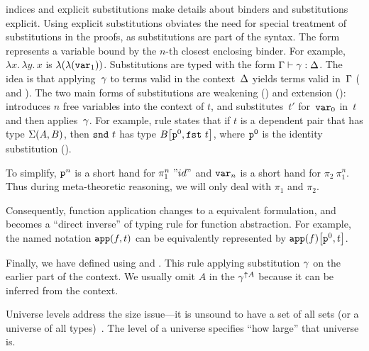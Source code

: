 
 indices and explicit substitutions make details about
binders and substitutions explicit.
%
Using explicit substitutions obviates the need for special treatment of
substitutions in the proofs, as substitutions are part of the syntax.
%
The form  represents a variable bound by the $n$-th closest enclosing binder.
For example, $\lambda x.\,\lambda y.\,x$ is $\lambda({\lambda({\texttt{var}_{1}})})$.
%
Substitutions are typed with the form 
$ {\Gamma} \vdash {\ensuremath{\gamma}} : {\Delta} $.
The idea is that applying~$\gamma$ to terms valid in the context~$\Delta$
yields terms valid in~$\Gamma$ ( and ).
%
The two main forms of substitutions are weakening () and extension ():
 introduces $n$ free variables into the context of $t$, and
 substitutes~$t'$ for~$\texttt{var}_{0}$ in~$t$ and
then applies~$\gamma$.
For example, rule  states that if $t$ is a dependent pair
that has type $\Sigma({A},{B})$, then $\texttt{snd}~{t}$ has type
${B}\!\left[{{\texttt{p}^{0}},{\texttt{fst}~{t}}}\right]$,
where $\texttt{p}^{0}$ is the identity substitution ().

To simplify, $\texttt{p}^{n}$ is a short hand for $\pi_1^n~"id"$ and $\texttt{var}_{n}$ is a short hand for $\pi_2~\pi_1^{n}$. Thus during meta-theoretic reasoning, we will only deal with $\pi_1$ and $\pi_2$.

Consequently, function application changes to a equivalent formulation, and becomes a ``direct inverse'' of typing rule for function abstraction. For example, the named notation $\texttt{app}({f},{t})$ can be equivalently represented by ${\texttt{app}({f})}\!\left[{{\texttt{p}^{0}},{t}}\right]$.

Finally, we have  defined using  and . This rule applying substitution $\gamma$ on the earlier part of the context. We usually omit $A$ in the $\gamma^{\uparrow A}$ because it can be inferred from the context.




Universe levels address the size issue---it is unsound to have a set of all sets
(or a universe of all types)~\cite{hurkens1995simplification}.
The level of a universe specifies ``how large'' that universe is.

